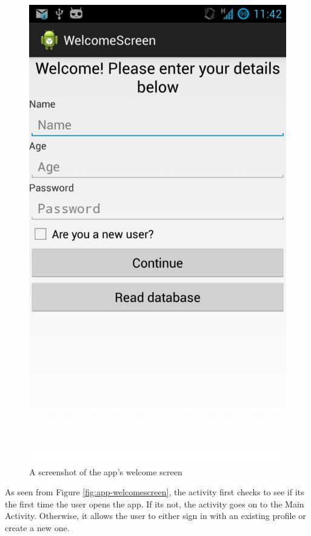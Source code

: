 \begin{figure}[h]
 \centering 
 \includegraphics[clip = true, trim = 0 320 0 60, scale=0.2]{welcome_screen}
 \caption{A screenshot of the app's welcome screen}
 \label{fig:welcomescreen-screenshot}
\end{figure}

As seen from Figure \ref{fig:app-welcomescreen}, the
activity first checks to see if its the first time the user opens the app. If its not,
the activity goes on to the Main Activity. Otherwise, it allows the user to either sign
in with an existing profile or create a new one.

